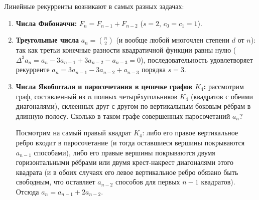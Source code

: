 \begin{example}
    Линейные рекурренты возникают в самых разных задачах:
    \begin{enumerate}
        \item \textbf{Числа Фибоначчи:} $F_n = F_{n-1} + F_{n-2}$ ($s = 2$, $c_0 = c_1 = 1$).
        \item \textbf{Треугольные числа} $a_n = \binom{n}{2}$ (и вообще любой многочлен степени $d$ от $n$): так как третьи конечные разности квадратичной функции равны нулю ($\Delta^3 a_n = a_n - 3a_{n-1} + 3a_{n-2} - a_{n-3} = 0$), последовательность удовлетворяет рекурренте $a_n = 3a_{n-1} - 3a_{n-2} + a_{n-3}$ порядка $s = 3$.
        \item \textbf{Числа Якобшталя и паросочетания в цепочке графов $K_4$:} рассмотрим граф, составленный из $n$ полных четырёхугольников $K_4$ (квадратов с обеими диагоналями), склеенных друг с другом по вертикальным боковым рёбрам в длинную полосу. Сколько в таком графе совершенных паросочетаний $a_n$?

        \begin{center}
        \end{center}

        Посмотрим на самый правый квадрат $K_4$: либо его правое вертикальное ребро входит в паросочетание (и тогда оставшиеся вершины покрываются $a_{n-1}$ способами), либо его правые вершины покрываются двумя горизонтальными рёбрами или двумя крест-накрест диагоналями этого квадрата (и в обоих случаях его левое вертикальное ребро обязано быть свободным, что оставляет $a_{n-2}$ способов для первых $n-1$ квадратов). Отсюда $a_n = a_{n-1} + 2 a_{n-2}$.
    \end{enumerate}
\end{example}

